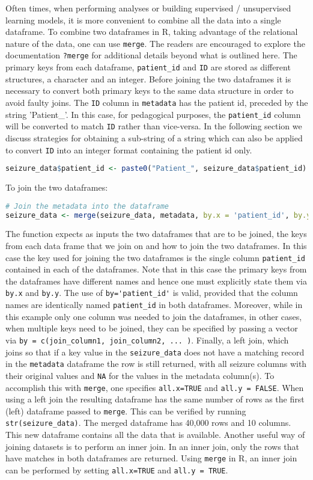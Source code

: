 Often times, when performing analyses or building supervised / unsupervised learning models, it is more convenient to combine all the data into a single dataframe. To combine two dataframes in R, taking advantage of the relational nature of the data, one can use \verb|merge|. The readers are encouraged to explore the documentation \verb|?merge| for additional details beyond what is outlined here. The primary keys from each dataframe, \verb|patient_id| and \verb|ID| are stored as different structures, a character and an integer. Before joining the two dataframes it is necessary to convert both primary keys to the same data structure in order to avoid faulty joins. The \verb|ID| column in \verb|metadata| has the patient id, preceded by the string 'Patient\_'. In this case, for pedagogical purposes, the \verb|patient_id| column will be converted to match \verb|ID| rather than vice-versa. In the following section we discuss strategies for obtaining a sub-string of a string which can also be applied to convert \verb|ID| into an integer format containing the patient id only.
\begin{lstlisting}[language=R]
seizure_data$patient_id <- paste0("Patient_", seizure_data$patient_id)
\end{lstlisting}
To join the two dataframes:
\begin{lstlisting}[language=R]
# Join the metadata into the dataframe
seizure_data <- merge(seizure_data, metadata, by.x = 'patient_id', by.y = 'ID', all.x = TRUE, all.y = FALSE)
\end{lstlisting}
The function expects as inputs the two dataframes that are to be joined, the keys from each data frame that we join on and how to join the two dataframes. In this case the key used for joining the two dataframes is the single column \verb|patient_id| contained in each of the dataframes. Note that in this case the primary keys from the dataframes have different names and hence one must explicitly state them via \verb|by.x| and \verb|by.y|. The use of \verb|by='patient_id'| is valid, provided that the column names are identically named \verb|patient_id| in both dataframes. Moreover, while in this example only one column was needed to join the dataframes, in other cases, when multiple keys need to be joined, they can be specified by passing a vector via \verb|by = c(join_column1, join_column2, ... )|.
Finally, a left join, which joins so that if a key value in the \verb|seizure_data| does not have a matching record in the \verb|metadata| dataframe the row is still returned, with all seizure columns with their original values and \verb|NA| for the values in the metadata column(s). To accomplish this with \verb|merge|, one specifies \verb|all.x=TRUE| and \verb|all.y = FALSE|. When using a left join the resulting dataframe has the same number of rows as the first (left) dataframe passed to \verb|merge|. This can be verified by running \verb|str(seizure_data)|. The merged dataframe has 40,000 rows and 10 columns. This new dataframe contains all the data that is available. Another useful way of joining datasets is to perform an inner join. In an inner join, only the rows that have matches in both dataframes are returned. Using \verb|merge| in R, an inner join can be performed by setting \verb|all.x=TRUE| and \verb|all.y = TRUE|.

